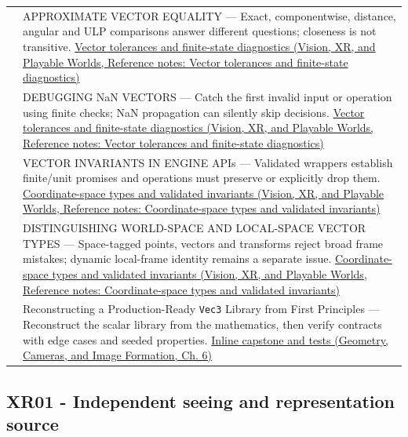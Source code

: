 {\begin{longtable}[]{@{}
  >{\raggedright\arraybackslash}p{}
  >{\raggedright\arraybackslash}p{}@{}}
596 & APPROXIMATE VECTOR EQUALITY --- Exact, componentwise, distance, angular and ULP comparisons answer different questions; closeness is not transitive. \href{../07-Vision-XR-and-Playable-Worlds/main.pdf\#nameddest=appendix-b5b83329215b}{Vector tolerances and finite-state diagnostics (Vision, XR, and Playable Worlds, Reference notes: Vector tolerances and finite-state diagnostics)} \\
597 & DEBUGGING NaN VECTORS --- Catch the first invalid input or operation using finite checks; NaN propagation can silently skip decisions. \href{../07-Vision-XR-and-Playable-Worlds/main.pdf\#nameddest=appendix-b5b83329215b}{Vector tolerances and finite-state diagnostics (Vision, XR, and Playable Worlds, Reference notes: Vector tolerances and finite-state diagnostics)} \\
598 & VECTOR INVARIANTS IN ENGINE APIs --- Validated wrappers establish finite/unit promises and operations must preserve or explicitly drop them. \href{../07-Vision-XR-and-Playable-Worlds/main.pdf\#nameddest=appendix-380a220e2529}{Coordinate-space types and validated invariants (Vision, XR, and Playable Worlds, Reference notes: Coordinate-space types and validated invariants)} \\
599 & DISTINGUISHING WORLD-SPACE AND LOCAL-SPACE VECTOR TYPES --- Space-tagged points, vectors and transforms reject broad frame mistakes; dynamic local-frame identity remains a separate issue. \href{../07-Vision-XR-and-Playable-Worlds/main.pdf\#nameddest=appendix-380a220e2529}{Coordinate-space types and validated invariants (Vision, XR, and Playable Worlds, Reference notes: Coordinate-space types and validated invariants)} \\
600 & Reconstructing a Production-Ready \texttt{Vec3} Library from First Principles --- Reconstruct the scalar library from the mathematics, then verify contracts with edge cases and seeded properties. \href{../03-Geometry-Cameras-and-Image-Formation/main.pdf\#nameddest=02-foundations-ii-ch037-a-complete-scalar-laboratory-makes-the-story-executable}{Inline capstone and tests (Geometry, Cameras, and Image Formation, Ch. 6)} \\
\end{longtable}
}

\subsection{XR01 - Independent seeing and representation source}\label{appendix-fd090d982a15-xr01---independent-seeing-and-representation-source}

